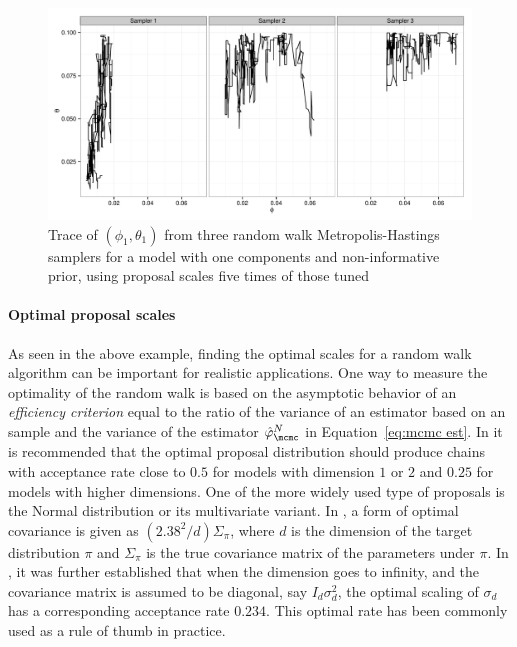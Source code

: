 \begin{figure}
  \includegraphics[width=\linewidth]{fig/PET_MH_H_Path.pdf}
  \caption{Trace of $(\phi_1,\theta_1)$ from three random walk
    Metropolis-Hastings samplers for a \pet model with one components and
    non-informative prior, using proposal scales five times of those tuned}
  \label{fig:pet mh untuned}
\end{figure}

\paragraph{Optimal proposal scales}

As seen in the above example, finding the optimal scales for a random walk
algorithm can be important for realistic applications. One way to measure the
optimality of the random walk is based on the asymptotic behavior of an
\emph{efficiency criterion} equal to the ratio of the variance of an estimator
based on an \iid sample and the variance of the estimator
$\hat\varphi_{\mcmc}^N$ in Equation~\eqref{eq:mcmc est}. In
\cite{Roberts:1997dg} it is recommended that the optimal proposal distribution
should produce chains with acceptance rate close to $0.5$ for models with
dimension $1$ or $2$ and $0.25$ for models with higher dimensions. One of the
more widely used type of proposals is the Normal distribution or its
multivariate variant. In \cite{Gelman:1995vx}, a form of optimal covariance is
given as $(2.38^2/d)\Sigma_{\pi}$, where $d$ is the dimension of the target
distribution $\pi$ and $\Sigma_{\pi}$ is the true covariance matrix of the
parameters under $\pi$. In \cite{Roberts:2001ta}, it was further established
that when the dimension goes to infinity, and the covariance matrix is assumed
to be diagonal, say $I_d\sigma_d^2$, the optimal scaling of $\sigma_d$ has a
corresponding acceptance rate $0.234$. This optimal rate has been commonly
used as a rule of thumb in practice.

